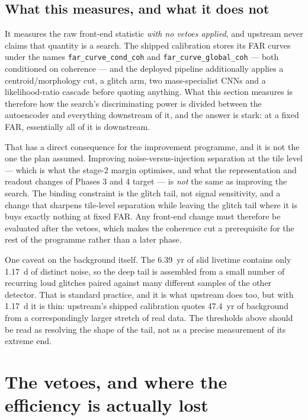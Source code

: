 \documentclass[11pt]{article}
\begin{document}
\subsection*{What this measures, and what it does not}

It measures the raw front-end statistic \emph{with no vetoes applied}, and upstream
never claims that quantity is a search. The shipped calibration stores its FAR curves
under the names \texttt{far\_curve\_cond\_coh} and \texttt{far\_curve\_global\_coh} ---
both conditioned on coherence --- and the deployed pipeline additionally applies a
centroid/morphology cut, a glitch arm, two mass-specialist CNNs and a likelihood-ratio
cascade before quoting anything. What this section measures is therefore how the search's
discriminating power is divided between the autoencoder and everything downstream of it,
and the answer is stark: at a fixed FAR, essentially all of it is downstream.

That has a direct consequence for the improvement programme, and it is not the one the
plan assumed. Improving noise-versus-injection separation at the tile level --- which is
what the stage-2 margin optimises, and what the representation and readout changes of
Phases 3 and 4 target --- is \emph{not} the same as improving the search. The binding
constraint is the glitch tail, not signal sensitivity, and a change that sharpens
tile-level separation while leaving the glitch tail where it is buys exactly nothing at
fixed FAR. Any front-end change must therefore be evaluated after the vetoes, which
makes the coherence cut a prerequisite for the rest of the programme rather than a later
phase.

One caveat on the background itself. The 6.39~yr of slid livetime contains only 1.17~d
of distinct noise, so the deep tail is assembled from a small number of recurring loud
glitches paired against many different samples of the other detector. That is standard
practice, and it is what upstream does too, but with 1.17~d it is thin: upstream's
shipped calibration quotes 47.4~yr of background from a correspondingly larger stretch of
real data. The thresholds above should be read as resolving the shape of the tail, not
as a precise measurement of its extreme end.

\section{The vetoes, and where the efficiency is actually lost}
\label{sec:coherence}
\end{document}
